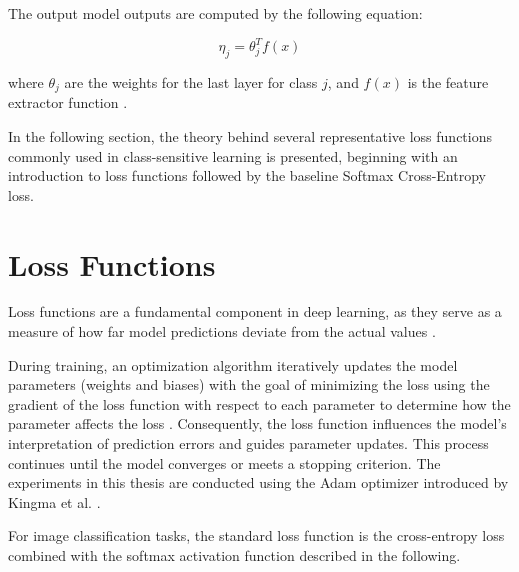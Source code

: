The output model outputs are computed by the following equation:

\begin{equation}
    \label{eq:logits}
    \eta_j = \theta^T_j f(x)
\end{equation}

where $\theta_j$ are the weights for the last layer for class $j$, and $f(x)$ is the feature extractor function \cite{ren2020balancedmetasoftmaxlongtailedvisual}.
\vspace{1em}

In the following section, the theory behind several representative loss functions commonly used in class-sensitive learning is presented, beginning with an introduction to loss functions followed by the baseline Softmax Cross-Entropy loss. 

\section{Loss Functions}
\label{sec:intro_losses}
Loss functions are a fundamental component in deep learning, as they serve as a measure of how far model predictions deviate from the actual values \cite{zhang2023dive,Goodfellow-et-al-2016}.

During training, an optimization algorithm iteratively updates the model parameters (weights and biases) with the goal of minimizing the loss using the gradient of the loss function with respect to each parameter to determine how the parameter affects the loss \cite{Goodfellow-et-al-2016}. Consequently, the loss function influences the model's interpretation of prediction errors and guides parameter updates. This process continues until the model converges or meets a stopping criterion. The experiments in this thesis are conducted using the Adam optimizer introduced by Kingma et al. \cite{kingma2017adammethodstochasticoptimization}.

For image classification tasks, the standard loss function is the cross-entropy loss combined with the softmax activation function \cite{zhang2023dive} described in the following.

